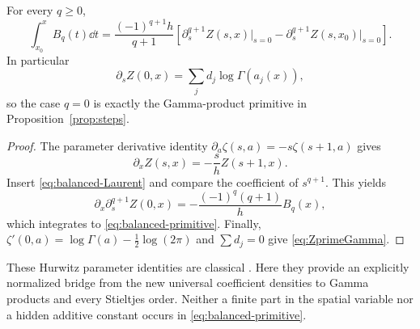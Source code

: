 \begin{proposition}\label{prop:balanced-primitives}
For every $q\ge0$,
\begin{equation}\label{eq:balanced-primitive}
 \int_{x_0}^x B_q(t)\dd t
 =\frac{(-1)^{q+1}h}{q+1}
       \left[\partial_s^{q+1}Z(s,x)\big|_{s=0}
             -\partial_s^{q+1}Z(s,x_0)\big|_{s=0}\right].
\end{equation}
In particular
\begin{equation}\label{eq:ZprimeGamma}
 \partial_sZ(0,x)=\sum_jd_j\log\Gamma(a_j(x)),
\end{equation}
so the case $q=0$ is exactly the Gamma-product primitive in Proposition~\ref{prop:steps}.
\end{proposition}
\begin{proof}
The parameter derivative identity $\partial_a\zeta(s,a)=-s\zeta(s+1,a)$ gives
\[
 \partial_xZ(s,x)=-\frac{s}{h}Z(s+1,x).
\]
Insert \eqref{eq:balanced-Laurent} and compare the coefficient of $s^{q+1}$. This yields
\[
 \partial_x\partial_s^{q+1}Z(0,x)
 =-\frac{(-1)^q(q+1)}hB_q(x),
\]
which integrates to \eqref{eq:balanced-primitive}. Finally,
$\zeta'(0,a)=\log\Gamma(a)-\frac12\log(2\pi)$ and $\sum d_j=0$ give \eqref{eq:ZprimeGamma}.
\end{proof}

These Hurwitz parameter identities are classical \cite{DLMFHurwitz}. Here they provide an explicitly normalized bridge from the new universal coefficient densities to Gamma products and every Stieltjes order. Neither a finite part in the spatial variable nor a hidden additive constant occurs in \eqref{eq:balanced-primitive}.
